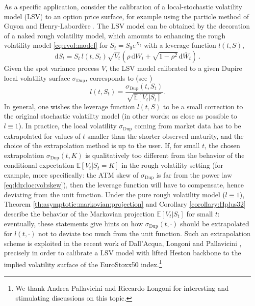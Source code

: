 \documentclass[11pt]{article}
\theoremstyle{plain}
\theoremstyle{definition}
\theoremstyle{remark}
\newcommand{\dd}{\mathrm{d}}
\newcommand{\1}{\mathbf{1}}
\numberwithin{equation}{section}
\begin{document}
As a specific application, consider the calibration of a local-stochastic volatility model (LSV) to an option price surface, for example using the particle method of Guyon and Henry-Labord{\`e}re \cite{GHL2012}. The LSV model can be obtained by the decoration of a naked rough volatility model, which amounts to enhancing the rough volatility model \eqref{eq:rvol:model} for $S_t = S_0 e^{X_t}$ with a leverage function $l(t,S)$,
\[
\dd S_t = S_t \, l(t,S_t) \sqrt{V_t} \left( \rho \, \dd W_t + \sqrt{1 - \rho^2} \, \dd \overline W_t \right) \,.
\]
Given the spot variance process $V$, the LSV model calibrated to a given Dupire local volatility surface $\sigma_\mathrm{Dup}$, corresponds to (see \cite{GHL2012})
\[
l(t,S_t) = \frac{ \sigma_\mathrm{Dup}(t,S_t) }  {\sqrt{ \mathbb E[V_t | S_t]}}.
\] 
In general, one wishes the leverage function $l(t,S)$ to be a small correction to the original stochastic volatility model (in other words: as close as possible to $l \equiv 1$).
In practice, the local volatility $\sigma_\mathrm{Dup}$ coming from market data has to be extrapolated  for values of $t$ smaller than the shorter observed maturity, and the choice of the extrapolation method is up to the user.
If, for small $t$, the chosen extrapolation $\sigma_\mathrm{Dup}(t,K)$ is qualitatively  too different from the behavior of the conditional expectation $\mathbb E[V_t | S_t = K]$ in the rough volatility setting (for example, more specifically: the ATM skew of $\sigma_\mathrm{Dup}$ is far from the power law \eqref{eq:ldp:loc:vol:skew}), then the leverage function will have to compensate, hence deviating from the unit function.
Under the pure rough volatility model ($l \equiv 1$), Theorem \ref{th:asymptotic:markovian:projection} and Corollary \ref{corollary:Hplus32} describe the behavior of  the Markovian projection $\mathbb E[V_t | S_t]$ for small $t$: eventually, these statements give hints on how $\sigma_\mathrm{Dup}(t,\cdot)$ should be extrapolated for $l(t,\cdot) $ not to deviate too much from the unit function.
Such an extrapolation scheme is exploited in the recent work of Dall'Acqua, Longoni and Pallavicini \cite{DallAcqua2022}, precisely in order to calibrate a LSV model with lifted Heston \cite{AbiJaber2019} backbone to the implied volatility surface of the EuroStoxx50 index.\footnote{We thank Andrea Pallavicini and Riccardo Longoni for interesting and stimulating discussions on this topic.}
\end{document}
